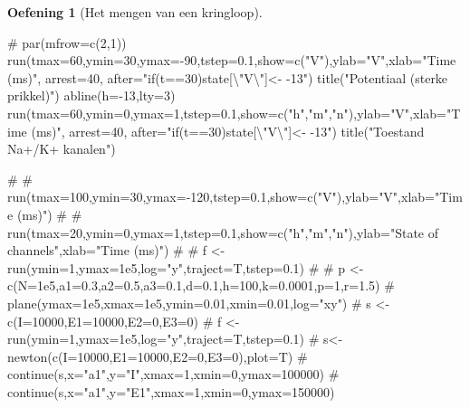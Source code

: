 \documentclass[
  a4paper,
]{scrbook}
\newenvironment{Shaded}{\begin{snugshade}}{\end{snugshade}}
\newcommand{\AttributeTok}[1]{\textcolor[rgb]{0.40,0.45,0.13}{#1}}
\newcommand{\CommentTok}[1]{\textcolor[rgb]{0.37,0.37,0.37}{#1}}
\newcommand{\DecValTok}[1]{\textcolor[rgb]{0.68,0.00,0.00}{#1}}
\newcommand{\FloatTok}[1]{\textcolor[rgb]{0.68,0.00,0.00}{#1}}
\newcommand{\FunctionTok}[1]{\textcolor[rgb]{0.28,0.35,0.67}{#1}}
\newcommand{\NormalTok}[1]{\textcolor[rgb]{0.00,0.23,0.31}{#1}}
\newcommand{\SpecialCharTok}[1]{\textcolor[rgb]{0.37,0.37,0.37}{#1}}
\newcommand{\StringTok}[1]{\textcolor[rgb]{0.13,0.47,0.30}{#1}}
\theoremstyle{definition}
\newtheorem{exercise}{Oefening}[chapter]
\theoremstyle{remark}
\begin{document}
\begin{exercise}[Het mengen van een
kringloop]
\begin{Shaded}
\begin{Highlighting}[]
\CommentTok{\# par(mfrow=c(2,1))}
\FunctionTok{run}\NormalTok{(}\AttributeTok{tmax=}\DecValTok{60}\NormalTok{,}\AttributeTok{ymin=}\DecValTok{30}\NormalTok{,}\AttributeTok{ymax=}\SpecialCharTok{{-}}\DecValTok{90}\NormalTok{,}\AttributeTok{tstep=}\FloatTok{0.1}\NormalTok{,}\AttributeTok{show=}\FunctionTok{c}\NormalTok{(}\StringTok{"V"}\NormalTok{),}\AttributeTok{ylab=}\StringTok{"V"}\NormalTok{,}\AttributeTok{xlab=}\StringTok{"Time (ms)"}\NormalTok{,}
    \AttributeTok{arrest=}\DecValTok{40}\NormalTok{, }\AttributeTok{after=}\StringTok{"if(t==30)state[}\SpecialCharTok{\textbackslash{}"}\StringTok{V}\SpecialCharTok{\textbackslash{}"}\StringTok{]\textless{}{-} {-}13"}\NormalTok{)}
\FunctionTok{title}\NormalTok{(}\StringTok{"Potentiaal (sterke prikkel)"}\NormalTok{)}
\FunctionTok{abline}\NormalTok{(}\AttributeTok{h=}\SpecialCharTok{{-}}\DecValTok{13}\NormalTok{,}\AttributeTok{lty=}\DecValTok{3}\NormalTok{)}
\FunctionTok{run}\NormalTok{(}\AttributeTok{tmax=}\DecValTok{60}\NormalTok{,}\AttributeTok{ymin=}\DecValTok{0}\NormalTok{,}\AttributeTok{ymax=}\DecValTok{1}\NormalTok{,}\AttributeTok{tstep=}\FloatTok{0.1}\NormalTok{,}\AttributeTok{show=}\FunctionTok{c}\NormalTok{(}\StringTok{"h"}\NormalTok{,}\StringTok{"m"}\NormalTok{,}\StringTok{"n"}\NormalTok{),}\AttributeTok{ylab=}\StringTok{"V"}\NormalTok{,}\AttributeTok{xlab=}\StringTok{"Time (ms)"}\NormalTok{,}
    \AttributeTok{arrest=}\DecValTok{40}\NormalTok{, }\AttributeTok{after=}\StringTok{"if(t==30)state[}\SpecialCharTok{\textbackslash{}"}\StringTok{V}\SpecialCharTok{\textbackslash{}"}\StringTok{]\textless{}{-} {-}13"}\NormalTok{)}
\FunctionTok{title}\NormalTok{(}\StringTok{"Toestand Na+/K+ kanalen"}\NormalTok{)}

\CommentTok{\# }
\CommentTok{\# run(tmax=100,ymin=30,ymax={-}120,tstep=0.1,show=c("V"),ylab="V",xlab="Time (ms)")}
\CommentTok{\# }
\CommentTok{\# run(tmax=20,ymin=0,ymax=1,tstep=0.1,show=c("h","m","n"),ylab="State of channels",xlab="Time (ms)")}
\CommentTok{\# }
\CommentTok{\# f \textless{}{-} run(ymin=1,ymax=1e5,log="y",traject=T,tstep=0.1)}
\CommentTok{\# }
\CommentTok{\# p \textless{}{-} c(N=1e5,a1=0.3,a2=0.5,a3=0.1,d=0.1,h=100,k=0.0001,p=1,r=1.5)}
\CommentTok{\# plane(ymax=1e5,xmax=1e5,ymin=0.01,xmin=0.01,log="xy")}
\CommentTok{\# s \textless{}{-} c(I=10000,E1=10000,E2=0,E3=0)}
\CommentTok{\# f \textless{}{-} run(ymin=1,ymax=1e5,log="y",traject=T,tstep=0.1)}
\CommentTok{\# s\textless{}{-} newton(c(I=10000,E1=10000,E2=0,E3=0),plot=T)}
\CommentTok{\# continue(s,x="a1",y="I",xmax=1,xmin=0,ymax=100000)}
\CommentTok{\# continue(s,x="a1",y="E1",xmax=1,xmin=0,ymax=150000)}
\end{Highlighting}
\end{Shaded}


\end{exercise}
\end{document}
